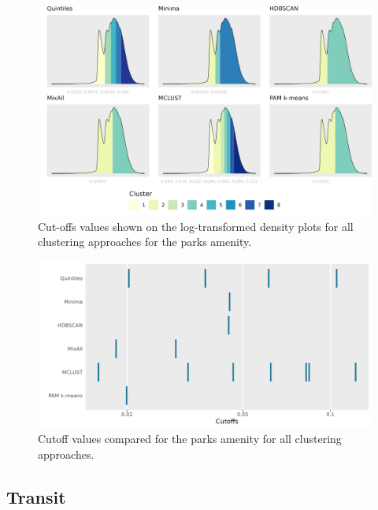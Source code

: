 \documentclass[11pt, a4paper]{article}
\begin{document}
\begin{figure}[H]
\centering
\includegraphics[width=\textwidth]{./cutoffs/by_amenity/Parks_cutoffs.png}
\caption[Parks cutoffs]{Cut-offs values shown on the log-transformed density plots for all clustering approaches for the parks amenity.}\label{parkscutoffs}
\end{figure}




\begin{figure}[H]
\centering
\includegraphics[width=\textwidth]{./cutoff_ticks/Parks_ticks.png}
\caption[Parks cutoff comparison]{Cutoff values compared for the parks amenity for all clustering approaches.}\label{parksticks}
\end{figure}









\pagebreak
\justifying
\subsection{Transit}
\end{document}
